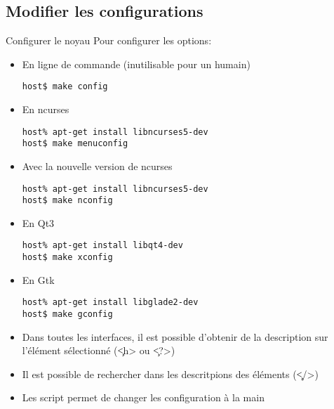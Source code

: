 \subsection{Modifier les configurations}
\begin{frame}[fragile=singleslide]{Configurer le noyau}
 Pour configurer les options:
 \begin{itemize}    
 \item En ligne de commande (inutilisable pour un humain)
   \begin{lstlisting}
host$ make config
   \end{lstlisting} %
 \item En ncurses
   \begin{lstlisting}
host% apt-get install libncurses5-dev
host$ make menuconfig
   \end{lstlisting} %
 \item Avec la nouvelle version de ncurses 
   \begin{lstlisting}
host% apt-get install libncurses5-dev
host$ make nconfig
   \end{lstlisting} %
 \item En Qt3
   \begin{lstlisting}
host% apt-get install libqt4-dev
host$ make xconfig
   \end{lstlisting} %
 \item En Gtk
   \begin{lstlisting}
host% apt-get install libglade2-dev
host$ make gconfig
   \end{lstlisting} %
 \item Dans toutes les interfaces,  il est possible d'obtenir de la
   description sur l'élément sélectionné (\c{<h>} ou \c{<?>})
 \item  Il est  possible de  rechercher dans  les  descritpions des
   éléments (\c{</>})
 \item  Les  script    permet  de  changer  les
   configuration à la main
 \end{itemize}
\end{frame}


